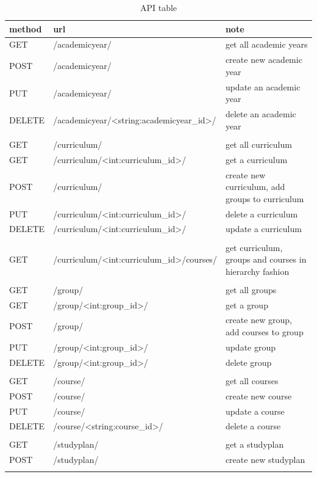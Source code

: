 \documentclass{article}
\begin{document}
\begin{table}[!h]
  \begin{center}
    \caption{API table}
    \label{tab:API reference table}
    \begin{tabular}{l|l|l} %
      \textbf{method} & \textbf{url}  & \textbf{note} \\ 
      \hline
      GET      & /academicyear/  & get all academic years \\
      POST    & /academicyear/  & create new academic year\\
      PUT      &  /academicyear/  & update an academic year\\
      DELETE & /academicyear/<string:academicyear\_id>/  & delete an academic year \\
      \\

      GET      & /curriculum/  & get all curriculum\\
      GET      &  /curriculum/<int:curriculum\_id>/ & get a curriculum  \\
      POST    & /curriculum/  & create new curriculum, add groups to curriculum \\
      PUT      &  /curriculum/<int:curriculum\_id>/  & delete a curriculum \\
      DELETE & /curriculum/<int:curriculum\_id>/  & update a curriculum \\
      \\
      GET & /curriculum/<int:curriculum\_id>/courses/ & get curriculum, groups and courses in hierarchy fashion\\
      \\
      GET      & /group/  & get all groups \\
      GET      &  /group/<int:group\_id>/  & get a group \\
      POST    & /group/  & create new group, add courses to group\\
      PUT      &  /group/<int:group\_id>/  & update group \\
      DELETE & /group/<int:group\_id>/  & delete group  \\
	\\
      GET      & /course/  & get all courses \\
      POST    & /course/ & create new course \\
      PUT      &  /course/  & update a course \\
      DELETE & /course/<string:course\_id>/  & delete a course \\
      \\

      GET   & /studyplan/ & get a studyplan \\
      POST & /studyplan/  & create new studyplan \\
      \\
      
    \end{tabular}
  \end{center}
\end{table}
\end{document}
